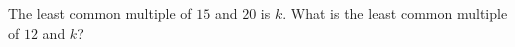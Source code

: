The least common multiple of $15$ and $20$ is $k$. What is the least common multiple of $12$ and $k$?
